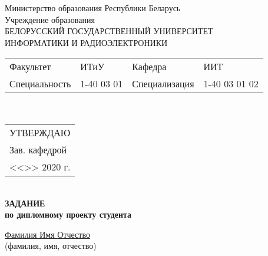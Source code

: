 {
  \thispagestyle{empty}
  \setlength{\parindent}{0em}

  \newcommand{\lineunderscore}{\uline{\hspace*{\fill}}}

  \begin{center}
    Министерство образования Республики Беларусь\\
    Учреждение образования\\
    БЕЛОРУССКИЙ ГОСУДАРСТВЕННЫЙ УНИВЕРСИТЕТ \\
    ИНФОРМАТИКИ И РАДИОЭЛЕКТРОНИКИ\\[1em]
  

  \begin{minipage}{\textwidth}
    \begin{flushleft}
      \begin{tabular}{ p{}p{}p{}p{} @{} }
        Факультет & ИТиУ & Кафедра & ИИТ \\
        Специальность   & 1-40 03 01 & Специализация & 1-40 03 01 02
      \end{tabular}
    \end{flushleft}
  \end{minipage}\\[1em]

  \begin{minipage}{\textwidth}
    \begin{flushright}
      \begin{tabular}{p{}}
        УТВЕРЖДАЮ \\[0.5em]
        \underline{\hspace*{7em}}     Зав. кафедрой \\
        
        <<\underline{\hspace*{4ex}}>> \underline{\hspace*{7em}} 2020 г.
      \end{tabular}
    \end{flushright}
  \end{minipage}\\[1em]

  \textbf{ЗАДАНИЕ} \\
  \textbf{по дипломному проекту студента}

  \lineunderscore\uline{Фамилия Имя Отчество}\lineunderscore \\
  {\small (фамилия, имя, отчество) }


\end{center}}
